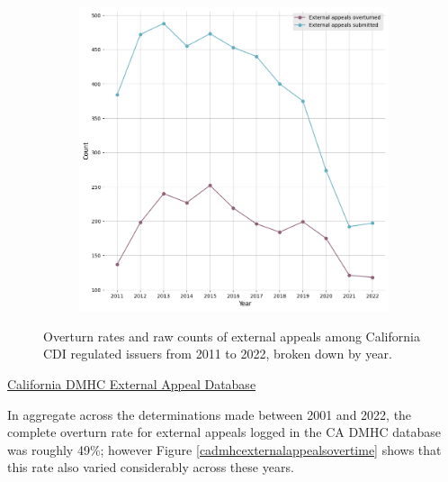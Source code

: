 \documentclass[12pt, a4paper,twoside,parskip=full]{report}
\theoremstyle{plain} %
\theoremstyle{definition} %
\theoremstyle{remark} %
\numberwithin{equation}{chapter}
\begin{document}
\begin{figure}[h!]
\begin{subfigure}[b]{0.49\textwidth}
				\includegraphics[width=\textwidth]{images/ca_doi_external_appeals/external_appeals_by_year.png}
			\end{subfigure}
			\caption{Overturn rates and raw counts of external appeals among California CDI regulated issuers from 2011 to 2022, broken down by year.}
			\label{cacdiexternalappealsovertime}
		\end{figure}
	
		\clearpage
		
		
		\underline{California DMHC External Appeal Database}
		
		In aggregate across the determinations made between 2001 and 2022, the complete overturn rate for external appeals logged in the CA DMHC database was roughly 49\%; however Figure \ref{cadmhcexternalappealsovertime} shows that this rate also varied considerably across these years.
		
\end{document}
